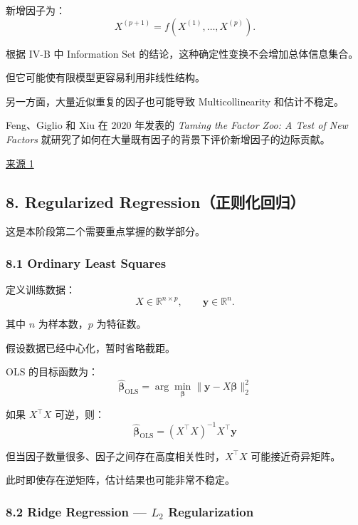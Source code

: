 新增因子为：
\[X^{(p+1)}
=
f(X^{(1)},\ldots,X^{(p)}).\]

根据 IV-B 中 Information Set 的结论，这种确定性变换不会增加总体信息集合。

但它可能使有限模型更容易利用非线性结构。

另一方面，大量近似重复的因子也可能导致 Multicollinearity 和估计不稳定。

Feng、Giglio 和 Xiu 在 2020 年发表的 \emph{Taming the Factor Zoo: A Test of New Factors} 就研究了如何在大量既有因子的背景下评价新增因子的边际贡献。

\href{https://onlinelibrary.wiley.com/doi/full/10.1111/jofi.12883}{来源 1}

\hypertarget{part-4-63-0001-regularized-regressionux6b63ux5219ux5316ux56deux5f52}{%
\subsection{8. Regularized Regression（正则化回归）}\label{part-4-63-0001-regularized-regressionux6b63ux5219ux5316ux56deux5f52}}

这是本阶段第二个需要重点掌握的数学部分。

\hypertarget{part-4-63-0001-ordinary-least-squares}{%
\subsubsection{8.1 Ordinary Least Squares}\label{part-4-63-0001-ordinary-least-squares}}

定义训练数据：
\[X\in\mathbb R^{n\times p},
\qquad
\boldsymbol y\in\mathbb R^n.\]

其中 \(n\) 为样本数，\(p\) 为特征数。

假设数据已经中心化，暂时省略截距。

OLS 的目标函数为：
\[\boxed{
\hat{\boldsymbol\beta}_{\mathrm{OLS}}
=
\arg\min_{\boldsymbol\beta}
\|\boldsymbol y-X\boldsymbol\beta\|_2^2
}\]

如果 \(X^\top X\) 可逆，则：
\[\boxed{
\hat{\boldsymbol\beta}_{\mathrm{OLS}}
=
(X^\top X)^{-1}X^\top\boldsymbol y
}\]

但当因子数量很多、因子之间存在高度相关性时，\(X^\top X\) 可能接近奇异矩阵。

此时即使存在逆矩阵，估计结果也可能非常不稳定。

\hypertarget{part-4-63-0001-ridge-regression-l_2-regularization}{%
\subsubsection{\texorpdfstring{8.2 Ridge Regression --- \(L_2\) Regularization}{8.2 Ridge Regression --- L\_2 Regularization}}\label{part-4-63-0001-ridge-regression-l_2-regularization}}

